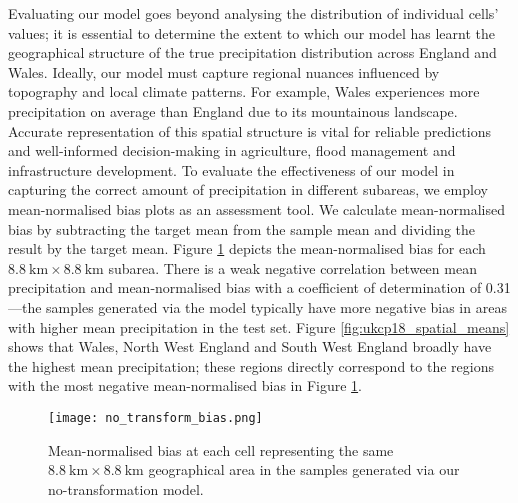 \documentclass[ oneside,%
                    author={George Herbert},
                    degree={MSci},
                     title={Diffusion Models for Time-Evolving Precipitation Fields},
                  subtitle={}]{dissertation}
\begin{document}
Evaluating our model goes beyond analysing the distribution of individual cells' values; it is essential to determine the extent to which our model has learnt the geographical structure of the true precipitation distribution across England and Wales. Ideally, our model must capture regional nuances influenced by topography and local climate patterns. For example, Wales experiences more precipitation on average than England due to its mountainous landscape. Accurate representation of this spatial structure is vital for reliable predictions and well-informed decision-making in agriculture, flood management and infrastructure development. To evaluate the effectiveness of our model in capturing the correct amount of precipitation in different subareas, we employ mean-normalised bias plots as an assessment tool. We calculate mean-normalised bias by subtracting the target mean from the sample mean and dividing the result by the target mean. Figure \ref{fig:no_transform_bias} depicts the mean-normalised bias for each $8.8\ \mathrm{km}\times8.8\ \mathrm{km}$ subarea. There is a weak negative correlation between mean precipitation and mean-normalised bias with a coefficient of determination of 0.31---the samples generated via the model typically have more negative bias in areas with higher mean precipitation in the test set. Figure \ref{fig:ukcp18_spatial_means} shows that Wales, North West England and South West England broadly have the highest mean precipitation; these regions directly correspond to the regions with the most negative mean-normalised bias in Figure \ref{fig:no_transform_bias}.

\begin{figure}[htbp]
      \centering
      \texttt{[image: no\_transform\_bias.png]}
      \caption{Mean-normalised bias at each cell representing the same $8.8\ \mathrm{km}\times 8.8\ \mathrm{km}$ geographical area in the samples generated via our no-transformation model.}
      \label{fig:no_transform_bias}
\end{figure}
\end{document}
